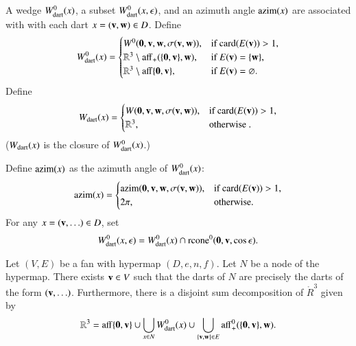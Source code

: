 A wedge $W^0_{\text{dart}}(x)$, a subset $W^0_{\text{dart}}(x,\epsilon)$,
and an azimuth angle ${\operatorname{azim}}(x)$ are associated with
with each dart $x=({\mathbf v},{\mathbf w})\in D$.  Define 
%
%
%
%
%
%
$$
W^0_{\text{dart}}(x)=
\begin{cases} 
W^0({\mathbf 0},{\mathbf v},{\mathbf w},\sigma({\mathbf v},{\mathbf w})),&\text{if }{\operatorname{card}}(E({\mathbf v}))>1,\\
\mathbb{R}^3\setminus {\operatorname{aff}}_+(\{{\mathbf 0},{\mathbf v}\},{\mathbf w}),&\text{if } E({\mathbf v}) = \{{\mathbf w}\},\\
\mathbb{R}^3\setminus {\operatorname{aff}}\{{\mathbf 0},{\mathbf v}\},&\text{if } E({\mathbf v}) = \varnothing.\\
\end{cases}
$$
Define
$$
W_{\text{dart}}(x) = 
\begin{cases} 
W({\mathbf 0},{\mathbf v},{\mathbf w},\sigma({\mathbf v},{\mathbf w})),&\text{if }{\operatorname{card}}(E({\mathbf v}))>1,\\
\mathbb{R}^3,&\text{otherwise }.\\
\end{cases}
$$
%
($W_{\text{dart}}(x)$ is the closure of $W^0_{\text{dart}}(x)$.)


Define ${\operatorname{azim}}(x)$ as the azimuth angle of $W^0_{\text{dart}}(x)$:
%
$$
{\operatorname{azim}}(x)=\begin{cases}
{\operatorname{azim}}({\mathbf 0},{\mathbf v},{\mathbf w},\sigma({\mathbf v},{\mathbf w})), &\text{if } {\operatorname{card}}(E({\mathbf v})) > 1,\\
2\pi, & \text{otherwise.}\\
\end{cases}
$$
For any $x = ({\mathbf v},\ldots)\in D$, set
    $$
    W^0_{\text{dart}}(x,\epsilon) = W^0_{\text{dart}}(x) \cap {\operatorname{rcone}}^0({\mathbf 0},{\mathbf v},\cos\epsilon).
    $$



\begin{lemma}
Let $(V,E)$ be a fan with hypermap $(D,e,n,f)$.  Let $N$ be a node of the hypermap.  There exists ${\mathbf v}\in V$
such that the darts of $N$ are precisely
the darts of the form $({\mathbf v},\ldots)$.  Furthermore, there is a 
disjoint sum decomposition of $\ring{R}^3$ given by
  $$
  \mathbb{R}^3 = 
  {\operatorname{aff}}\{{\mathbf 0},{\mathbf v}\} \cup
  \bigcup_{x\in N} W^0_{\text{dart}}(x)  \cup 
  \bigcup_{\{{\mathbf v},{\mathbf w}\}\in E} {\operatorname{aff}}_+^0(\{{\mathbf 0},{\mathbf v}\},{\mathbf w}).
  $$
\end{lemma}
%
%
%

